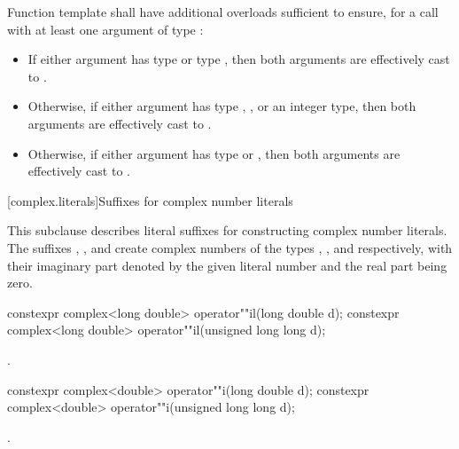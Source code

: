 \pnum
{}%
Function template  shall have additional overloads sufficient to
ensure, for a call with at least one argument of type :
\begin{itemize}
  \item If either argument has type  or type , then both arguments are effectively cast to
        .
  \item Otherwise, if either argument has type , ,
        or an integer type, then both arguments are effectively cast to
        .
  \item Otherwise, if either argument has type  or ,
        then both arguments are effectively cast to .
\end{itemize}

[complex.literals]{Suffixes for complex number literals}

%
\pnum
This subclause describes literal suffixes for constructing complex number literals.
The suffixes , , and  create complex numbers of
the types , , and
 respectively, with their imaginary part denoted by the
given literal number and the real part being zero.

%
\begin{itemdecl}
constexpr complex<long double> operator""il(long double d);
constexpr complex<long double> operator""il(unsigned long long d);
\end{itemdecl}

\begin{itemdescr}
\pnum
\returns
{}.
\end{itemdescr}

%
\begin{itemdecl}
constexpr complex<double> operator""i(long double d);
constexpr complex<double> operator""i(unsigned long long d);
\end{itemdecl}

\begin{itemdescr}
\pnum
\returns
{}.
\end{itemdescr}

